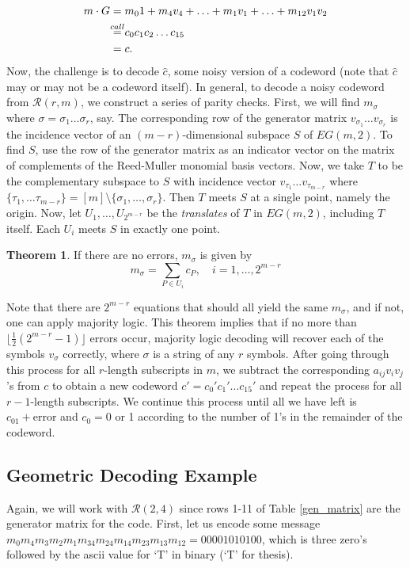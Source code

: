 \documentclass[12pt,twoside]{reedthesis}
\theoremstyle{definition}
\newtheorem{theorem}{Theorem}[chapter]
\begin{document}
\begin{align*}
m \cdot G 
&= m_01 + m_4v_4 + \ldots + m_1v_1 + \ldots + m_{12}v_1v_2 \\
& \stackrel{\mathclap{call}}{=} c_0c_1c_2\ldots c_{15} \\
& = c.
\end{align*}
Now, the challenge is to decode $\hat{c}$, some noisy version of a codeword (note that $\hat{c}$ may or may not be a codeword itself). In general, to decode a noisy codeword from $\mathscr{R}(r,m)$, we construct a series of parity checks. First, we will find $m_\sigma$ where $\sigma = \sigma_1 \ldots \sigma_r$, say. The corresponding row of the generator matrix $v_{\sigma_1} \ldots v_{\sigma_r}$ is the incidence vector of an $(m-r)$-dimensional subspace $S$ of $EG(m,2)$. To find $S$, use the row of the generator matrix as an indicator vector on the matrix of complements of the Reed-Muller monomial basis vectors. Now, we take $T$ to be the complementary subspace to $S$ with incidence vector $v_{\tau_1}\ldots v_{\tau_{m-r}}$ where $\{\tau_1, \ldots \tau_{m-r}\} = [m]\setminus \{\sigma_1, \ldots, \sigma_r\}$. Then $T$ meets $S$ at a single point, namely the origin. Now, let $U_1, \ldots, U_{2^{m-r}}$ be the \textit{translates} of $T$ in $EG(m,2)$, including $T$ itself. Each $U_i$ meets $S$ in exactly one point.

\begin{theorem} \label{error_correct_thm}
If there are no errors, $m_\sigma$ is given by
\begin{equation*}
m_\sigma = \sum_{P\in U_i} c_{P}, \quad i = 1, \ldots, 2^{m-r}
\end{equation*}
\end{theorem}
Note that there are $2^{m-r}$ equations that should all yield the same $m_{\sigma}$, and if not, one can apply majority logic. This theorem implies that if no more than $\lfloor\frac{1}{2}(2^{m-r} -1)\rfloor$ errors occur, majority logic decoding will recover each of the symbols $v_{\sigma}$ correctly, where $\sigma$ is a string of any $r$ symbols. 
	After going through this process for all $r$-length subscripts in $m$, we subtract the corresponding $a_{ij}v_iv_j$'s from $c$ to obtain a new codeword $c' = c_0'c_1' \ldots c_{15}'$ and repeat the process for all $r-1$-length subscripts. We continue this process until all we have left is $c_01 + \text{error}$ and $c_0 = 0$ or 1 according to the number of 1's in the remainder of the codeword.
	
\subsection{Geometric Decoding Example}
Again, we will work with $\mathscr{R}(2,4)$ since rows 1-11 of Table \ref{gen_matrix} are the generator matrix for the code. First, let us encode some message $ m_0m_4m_3m_2m_1m_{34}m_{24}m_{14}m_{23}m_{13}m_{12} = 00001010100$, which is three zero's followed by the ascii value for `T' in binary (`T' for thesis). 
\end{document}
